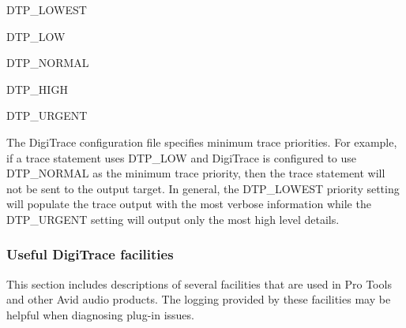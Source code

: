  
\begin{DoxyItemize}
\item {\ttfamily D\+T\+P\+\_\+\+L\+O\+W\+E\+S\+T } 
\item {\ttfamily D\+T\+P\+\_\+\+L\+O\+W } 
\item {\ttfamily D\+T\+P\+\_\+\+N\+O\+R\+M\+A\+L } 
\item {\ttfamily D\+T\+P\+\_\+\+H\+I\+G\+H } 
\item {\ttfamily D\+T\+P\+\_\+\+U\+R\+G\+E\+N\+T } 
\end{DoxyItemize}

 The Digi\+Trace configuration file specifies minimum trace priorities. For example, if a trace statement uses {\ttfamily D\+T\+P\+\_\+\+L\+O\+W} and Digi\+Trace is configured to use {\ttfamily D\+T\+P\+\_\+\+N\+O\+R\+M\+A\+L} as the minimum trace priority, then the trace statement will not be sent to the output target. In general, the {\ttfamily D\+T\+P\+\_\+\+L\+O\+W\+E\+S\+T} priority setting will populate the trace output with the most verbose information while the {\ttfamily D\+T\+P\+\_\+\+U\+R\+G\+E\+N\+T} setting will output only the most high level details.

\hypertarget{a00364_digitrace__configuring__facilities}{}\subsubsection{Useful Digi\+Trace facilities}\label{a00364_digitrace__configuring__facilities}
 This section includes descriptions of several facilities that are used in Pro Tools and other Avid audio products. The logging provided by these facilities may be helpful when diagnosing plug-\/in issues.


